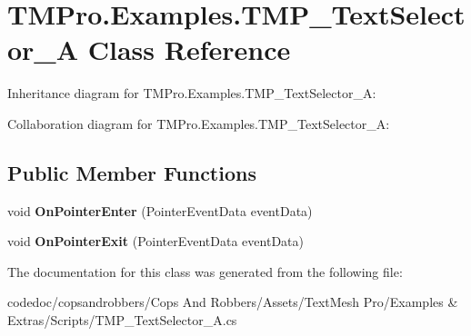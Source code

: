 \hypertarget{classTMPro_1_1Examples_1_1TMP__TextSelector__A}{}\section{T\+M\+Pro.\+Examples.\+T\+M\+P\+\_\+\+Text\+Selector\+\_\+A Class Reference}
\label{classTMPro_1_1Examples_1_1TMP__TextSelector__A}


Inheritance diagram for T\+M\+Pro.\+Examples.\+T\+M\+P\+\_\+\+Text\+Selector\+\_\+A\+:


Collaboration diagram for T\+M\+Pro.\+Examples.\+T\+M\+P\+\_\+\+Text\+Selector\+\_\+A\+:
\subsection*{Public Member Functions}
\begin{DoxyCompactItemize}
\item 
\mbox{\label{classTMPro_1_1Examples_1_1TMP__TextSelector__A_a41f448ef3c5dd89abfdcb8ded5c46d89}} 
void {\bfseries On\+Pointer\+Enter} (Pointer\+Event\+Data event\+Data)
\item 
\mbox{\label{classTMPro_1_1Examples_1_1TMP__TextSelector__A_a5214229e809ada98db644b76cbdf145a}} 
void {\bfseries On\+Pointer\+Exit} (Pointer\+Event\+Data event\+Data)
\end{DoxyCompactItemize}


The documentation for this class was generated from the following file\+:\begin{DoxyCompactItemize}
\item 
codedoc/copsandrobbers/\+Cops And Robbers/\+Assets/\+Text\+Mesh Pro/\+Examples \& Extras/\+Scripts/T\+M\+P\+\_\+\+Text\+Selector\+\_\+\+A.\+cs\end{DoxyCompactItemize}
